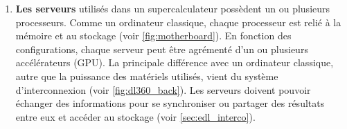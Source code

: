         \begin{enumerate}
        
            \item \textbf{Les serveurs} utilisés dans un supercalculateur possèdent un ou plusieurs processeurs. Comme un ordinateur classique, chaque processeur est relié à la mémoire et au stockage (voir \autoref{fig:motherboard}). En fonction des configurations, chaque serveur peut être agrémenté d'un ou plusieurs accélérateurs (GPU). La principale différence avec un ordinateur classique, autre que la puissance des matériels utilisés, vient du système d'interconnexion (voir \autoref{fig:dl360_back}). Les serveurs doivent pouvoir échanger des informations pour se synchroniser ou partager des résultats entre eux et accéder au stockage (voir \autoref{sec:edl_interco}).
        

\end{enumerate}
